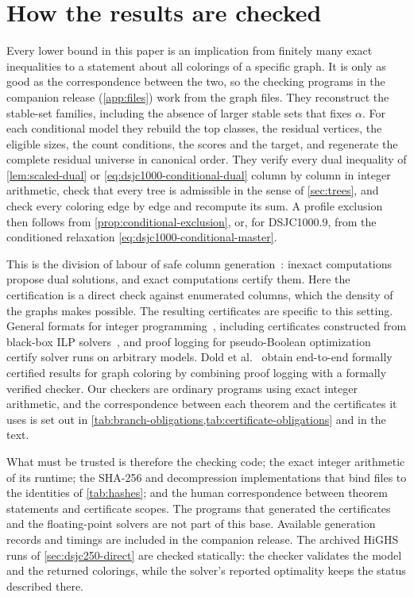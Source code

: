 \documentclass[11pt]{article}
\theoremstyle{definition}
\newcommand{\DSJCThousand}{\textnormal{\textsc{DSJC1000.9}}}
\begin{document}
\section{How the results are checked}
\label{sec:verification}

Every lower bound in this paper is an implication from finitely many exact
inequalities to a statement about all colorings of a specific graph. It is
only as good as the correspondence between the two, so the checking programs
in the companion release (\cref{app:files}) work from the graph files. They
reconstruct the stable-set families, including the absence of larger stable
sets that fixes $\alpha$. For each conditional model they rebuild the top
classes, the residual vertices, the eligible sizes, the count conditions, the
scores and the target, and regenerate the complete residual universe in
canonical order. They verify every dual inequality of
\cref{lem:scaled-dual} or \eqref{eq:dsjc1000-conditional-dual} column by
column in integer arithmetic, check that every tree is admissible in the
sense of \cref{sec:trees}, and check every coloring edge by edge and
recompute its sum. A profile exclusion then follows from
\cref{prop:conditional-exclusion}, or, for \DSJCThousand{}, from the
conditioned relaxation \eqref{eq:dsjc1000-conditional-master}.

This is the division of labour of safe column generation~\cite{held2012}:
inexact computations propose dual solutions, and exact computations certify
them. Here the certification is a direct check against enumerated columns,
which the density of the graphs makes possible. The resulting certificates
are specific to this setting. General formats for integer
programming~\cite{cheung2017}, including certificates constructed from
black-box ILP solvers~\cite{szeider2026}, and proof logging for
pseudo-Boolean optimization~\cite{koops2025} certify solver runs on arbitrary
models. Dold et al.~\cite{dold2026} obtain end-to-end formally certified
results for graph coloring by combining proof logging with a formally verified
checker. Our checkers are ordinary programs using exact integer arithmetic,
and the correspondence between each theorem and the certificates it uses is
set out in \cref{tab:branch-obligations,tab:certificate-obligations} and in
the text.

What must be trusted is therefore the checking code; the exact integer
arithmetic of its runtime; the SHA-256 and decompression implementations that
bind files to the identities of \cref{tab:hashes}; and the human
correspondence between theorem statements and certificate scopes. The
programs that generated the certificates and the floating-point solvers are
not part of this base. Available generation records and timings are included
in the companion release. The archived HiGHS runs of \cref{sec:dsjc250-direct} are
checked statically: the checker validates the model and the returned
colorings, while the solver's reported optimality keeps the status described
there.
\end{document}
